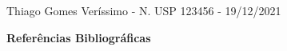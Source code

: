 \documentclass[12pt]{article}
\begin{document}
\begin{center}
{}

\vspace{1.5cm}

{}
\end{center}
\vspace{1cm}

\begin{minipage}{0.8\textwidth}
	\begin{flushright}
	Thiago Gomes Veríssimo - N. USP 123456 - 19/12/2021
	\end{flushright}
\end{minipage}

\vspace{1.0cm}



\textbf{Referências Bibliográficas}
\renewcommand\refname{\vskip -1cm}


\end{document}
